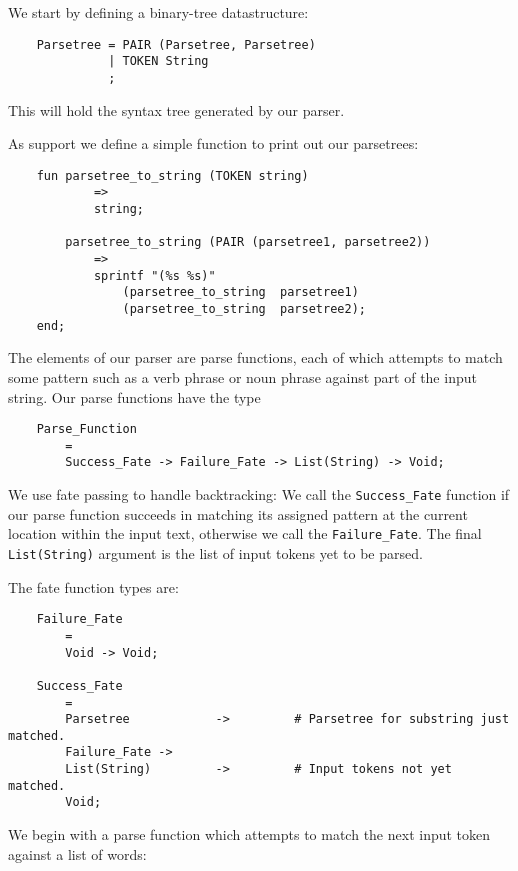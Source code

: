 We start by defining a binary-tree datastructure:

\begin{verbatim}
    Parsetree = PAIR (Parsetree, Parsetree)
              | TOKEN String
              ;
\end{verbatim}

This will hold the syntax tree generated by our parser.

As support we define a simple function to print out our parsetrees:

\begin{verbatim}
    fun parsetree_to_string (TOKEN string)
            =>
            string;

        parsetree_to_string (PAIR (parsetree1, parsetree2))
            =>
            sprintf "(%s %s)"
                (parsetree_to_string  parsetree1)
                (parsetree_to_string  parsetree2);
    end;
\end{verbatim}

The elements of our parser are parse functions, each 
of which attempts to match some pattern such as a verb phrase 
or noun phrase against part of the input string.  Our parse 
functions have the type

\begin{verbatim}
    Parse_Function
        =
        Success_Fate -> Failure_Fate -> List(String) -> Void;
\end{verbatim}

We use fate passing to handle backtracking:  We 
call the {\tt Success\_Fate} function if our parse function 
succeeds in matching its assigned pattern at the current location within 
the input text, otherwise we call the {\tt Failure\_Fate}.
The final {\tt List(String)} argument is the list of input 
tokens yet to be parsed.

The fate function types are:

\begin{verbatim}
    Failure_Fate
        =
        Void -> Void;

    Success_Fate
        =
        Parsetree            ->         # Parsetree for substring just matched.
        Failure_Fate ->
        List(String)         ->         # Input tokens not yet matched.
        Void;
\end{verbatim}

We begin with a parse function which attempts to match the next 
input token against a list of words:


